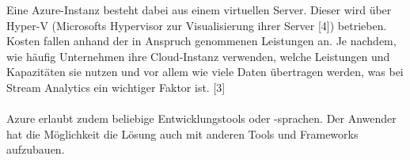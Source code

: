 Eine Azure-Instanz besteht dabei aus einem virtuellen Server. Dieser wird über Hyper-V (Microsofts Hypervisor zur Visualisierung ihrer Server [4]) betrieben. Kosten fallen anhand der in Anspruch genommenen Leistungen an. Je nachdem, wie häufig Unternehmen ihre Cloud-Instanz verwenden, welche Leistungen und Kapazitäten sie nutzen und vor allem wie viele Daten übertragen werden, was bei Stream Analytics ein wichtiger Faktor ist. [3]\\ \\
Azure erlaubt zudem beliebige Entwicklungstools oder -sprachen. Der Anwender hat die Möglichkeit die Lösung auch mit anderen Tools und Frameworks aufzubauen. 
